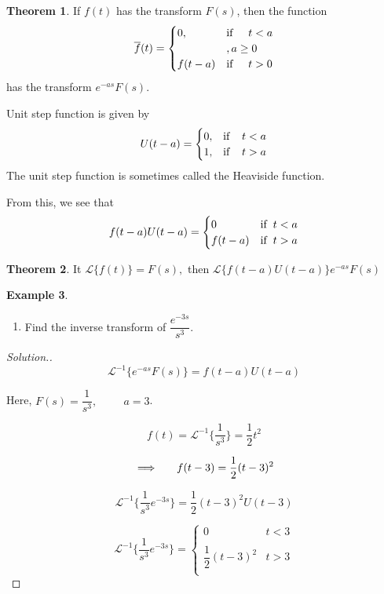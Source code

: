 \documentclass[11pt,a4paper]{article}
\theoremstyle{definition}
\newtheorem{thm}{Theorem}[subsection]
\newtheorem{exa}[thm]{Example}
\newenvironment{solution}
  {\renewcommand{\qedsymbol}{}\begin{proof}[\textit{Solution}.]}
  {\end{proof}}
\begin{document}
\begin{thm}


If $f(t)$ has the transform $F(s)$, then the function 
\[\overline{f}(t) =
\begin{cases}
0, & \text{if}\hspace{0.5cm} t<a\\
 & , a\geq 0\\
f(t-a) & \text{if}\hspace{0.5cm} t>0\\
\end{cases}
\] has the transform $\displaystyle{e^{-as}F(s)}$.


Unit step function is given by 
\[ U(t-a) =
\begin{cases}
0, & \text{if} \hspace{0.4cm} t<a\\
1, & \text{if}\hspace{0.4cm} t>a\\
\end{cases}
\]
The unit step function is sometimes called the Heaviside function.


From this, we see that 
\[f(t-a)U(t-a) = 
\begin{cases}
0 & \text{if} \hspace{0.2cm} t<a\\
f(t-a) & \text{if}\hspace{0.2cm} t>a\\
\end{cases}
\]
\vspace{1cm}
\end{thm}

\begin{thm}


It $\mathcal{L}\{f(t)\} = F(s),$ then $\displaystyle{\mathcal{L}\{f(t-a)U(t-a)\}e^{-as}F(s)}$
\end{thm}


\begin{exa}
\begin{enumerate}
\item Find the inverse transform of $\dfrac{e^{-3s}}{s^3}$.
\end{enumerate}
\end{exa}

\begin{solution}
$$\mathcal{L}^{-1} \Big\{e^{-as}F(s)\Big\} = f(t-a) U(t-a)$$

Here, $F(s) = \dfrac{1}{s^3},\hspace{1cm} a = 3$.

$$f(t) = \mathcal{L}^{-1}\big\{\frac{1}{s^3}\big\} = \frac{1}{2}t^2$$

$$\implies\hspace{0.5cm} f(t-3) = \frac{1}{2}(t-3)^2$$

$$\mathcal{L}^{-1}\Big\{ \frac{1}{s^3}e^{-3s}\Big\} = \frac{1}{2}(t-3)^2U(t-3)$$

\[
\mathcal{L}^{-1}\Big\{ \frac{1}{s^3}e^{-3s}\Big\} =
\begin{cases}
0 & t<3\\\\
\dfrac{1}{2}(t -3)^2 & t>3\\
\end{cases}
\]
\end{solution}
\end{document}
